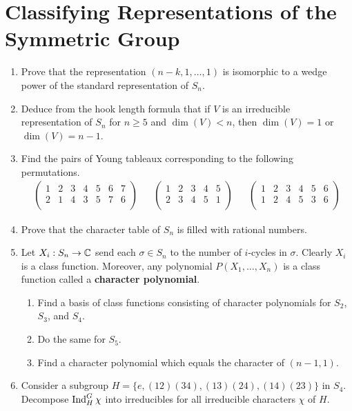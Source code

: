 \documentclass[../psets.tex]{subfiles}
\begin{document}
\section{Classifying Representations of the Symmetric Group}
\begin{enumerate}
    \item {}Prove that the representation $(n-k,1,\dots,1)$ is isomorphic to a wedge power of the standard representation of $S_n$.
    \item Deduce from the hook length formula that if $V$ is an irreducible representation of $S_n$ for $n\geq 5$ and $\dim(V)<n$, then $\dim(V)=1$ or $\dim(V)=n-1$.
    \item Find the pairs of Young tableaux corresponding to the following permutations.
    \begin{align*}
        \begin{pmatrix}
            1 & 2 & 3 & 4 & 5 & 6 & 7\\
            2 & 1 & 4 & 3 & 5 & 7 & 6\\
        \end{pmatrix}&&
        \begin{pmatrix}
            1 & 2 & 3 & 4 & 5\\
            2 & 3 & 4 & 5 & 1\\
        \end{pmatrix}&&
        \begin{pmatrix}
            1 & 2 & 3 & 4 & 5 & 6\\
            1 & 2 & 4 & 5 & 3 & 6\\
        \end{pmatrix}
    \end{align*}
    \item Prove that the character table of $S_n$ is filled with rational numbers.
    \item Let $X_i:S_n\to\mathbb{C}$ send each $\sigma\in S_n$ to the number of $i$-cycles in $\sigma$. Clearly $X_i$ is a class function. Moreover, any polynomial $P(X_1,\dots,X_n)$ is a class function called a \textbf{character polynomial}.
    \begin{enumerate}
        \item Find a basis of class functions consisting of character polynomials for $S_2$, $S_3$, and $S_4$.
        \item Do the same for $S_5$.
        \item Find a character polynomial which equals the character of $(n-1,1)$.
    \end{enumerate}
    \item Consider a subgroup $H=\{e,(12)(34),(13)(24),(14)(23)\}$ in $S_4$. Decompose $\operatorname{Ind}_H^G\chi$ into irreducibles for all irreducible characters $\chi$ of $H$.
\end{enumerate}
\end{document}
